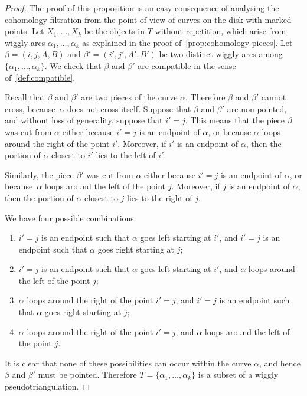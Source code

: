 \documentclass{amsart}
\theoremstyle{definition}
\begin{document}
\begin{proof}
  The proof of this proposition is an easy consequence of analysing the cohomology filtration from the point of view of curves on the disk with marked points.
  Let \(X_1, \ldots, X_k\) be the objects in \(T\) without repetition, which arise from wiggly arcs \(\alpha_1, \ldots, \alpha_k\) as explained in the proof of~\cref{prop:cohomology-pieces}.
  Let \(\beta = (i,j,A,B)\) and \(\beta' = (i',j', A',B')\) be two distinct wiggly arcs among \(\{\alpha_1, \ldots,\alpha_k\}\).
  We check that \(\beta\) and \(\beta'\) are compatible in the sense of~\cref{def:compatible}.
  
  Recall that \(\beta\) and \(\beta'\) are two pieces of the curve \(\alpha\).
  Therefore \(\beta\) and \(\beta'\) cannot cross, because~\(\alpha\) does not cross itself.
  Suppose that \(\beta\) and \(\beta'\) are non-pointed, and without loss of generality, suppose that \(i' = j\).
  This means that the piece \(\beta\) was cut from \(\alpha\) either because \(i' = j\) is an endpoint of \(\alpha\), or because \(\alpha\) loops around the right of the point \(i'\).
  Moreover, if \(i'\) is an endpoint of \(\alpha\), then the portion of \(\alpha\) closest to \(i'\) lies to the left of \(i'\).
  
  Similarly, the piece \(\beta'\) was cut from \(\alpha\) either because \(i' = j\) is an endpoint of \(\alpha\), or because~\(\alpha\) loops around the left of the point \(j\).
  Moreover, if \(j\) is an endpoint of \(\alpha\), then the portion of \(\alpha\) closest to \(j\) lies to the right of \(j\).

  We have four possible combinations:
  \begin{enumerate}
  \item \(i' = j\) is an endpoint such that \(\alpha\) goes left starting at \(i'\), and \(i' = j\) is an endpoint such that \(\alpha\) goes right starting at \(j\);
  \item \(i' = j\) is an endpoint such that \(\alpha\) goes left starting at \(i'\), and \(\alpha\) loops around the left of the point \(j\);
  \item \(\alpha\) loops around the right of the point \(i' = j\), and \(i' = j\) is an endpoint such that \(\alpha\) goes right starting at \(j\); 
  \item \(\alpha\) loops around the right of the point \(i' = j\), and \(\alpha\) loops around the left of the point \(j\).
  \end{enumerate}
  It is clear that none of these possibilities can occur within the curve \(\alpha\), and hence \(\beta\) and \(\beta'\) must be pointed.
  Therefore \(T = \{\alpha_1, \ldots, \alpha_k\}\) is a subset of a wiggly pseudotriangulation.


\end{proof}
\end{document}
